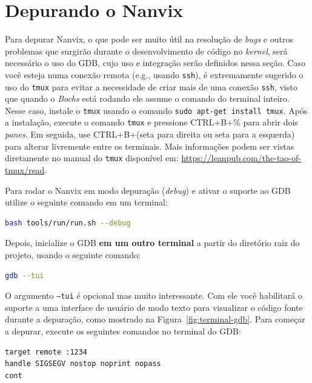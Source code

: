 \documentclass[11pt]{article}
\begin{document}
\section{Depurando o Nanvix}
\label{sec:debug}

Para depurar Nanvix, o que pode ser muito útil na resolução de \textit{bugs} e outros problemas que surgirão durante o desenvolvimento de código no \textit{kernel}, será necessário o uso do GDB, cujo uso e integração serão definidos nessa seção. Caso você esteja numa conexão remota (e.g., usando \texttt{ssh}), é extremamente sugerido o uso do \texttt{tmux} para evitar a necessidade de criar mais de uma conexão \texttt{ssh}, visto que quando o \textit{Bochs} está rodando ele assume o comando do terminal inteiro. Nesse caso, instale o \texttt{tmux} usando o comando \texttt{sudo apt-get install tmux}. Após a instalação, execute o comando \texttt{tmux} e pressione CTRL+B+\% para abrir dois \textit{panes}. Em seguida, use CTRL+B+(seta para direita ou seta para a esquerda) para alterar livremente entre os terminais. Mais informações podem ser vistas diretamente no manual do \texttt{tmux} disponível em: \url{https://leanpub.com/the-tao-of-tmux/read}.

Para rodar o Nanvix em modo depuração (\textit{debug}) e ativar o suporte ao GDB utilize o seguinte comando em um terminal: \\

\begin{lstlisting}[language=bash,numbers=none,frame=single]
bash tools/run/run.sh --debug
\end{lstlisting}

\vspace{0.3cm}
Depois, inicialize o GDB \textbf{em um outro terminal} a partir do diretório raiz do projeto, usando o seguinte comando: \\

\begin{lstlisting}[language=bash,numbers=none,frame=single]
gdb --tui
\end{lstlisting}

O argumento \texttt{--tui} é opcional mas muito interessante. Com ele você habilitará o suporte a uma interface de usuário de modo texto para visualizar o código fonte durante a depuração, como mostrado na Figura~\ref{fig:terminal-gdb}.
\newpage
Para começar a depurar, execute os seguintes comandos no terminal do GDB:\\

\begin{lstlisting}[language=sh,numbers=none,frame=single]
target remote :1234
handle SIGSEGV nostop noprint nopass
cont
\end{lstlisting}
\end{document}
